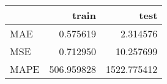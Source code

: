 \begin{tabular}{lrr}
\toprule
{} &       train &         test \\
\midrule
MAE  &    0.575619 &     2.314576 \\
MSE  &    0.712950 &    10.257699 \\
MAPE &  506.959828 &  1522.775412 \\
\bottomrule
\end{tabular}
